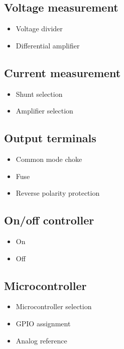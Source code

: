 \FloatBarrier

\subsection{Voltage measurement}
\label{sec_volt_meas}
\begin{itemize}
    \item Voltage divider
    \item Differential amplifier
\end{itemize}

\FloatBarrier

\subsection{Current measurement}
\label{sec_cur_meas}
\begin{itemize}
    \item Shunt selection
    \item Amplifier selection
\end{itemize}

\FloatBarrier

\subsection{Output terminals}
\label{sec_out_term}
\begin{itemize}
    \item Common mode choke
    \item Fuse
    \item Reverse polarity protection
\end{itemize}

\FloatBarrier

\subsection{On/off controller}
\label{sec_onoff}
\begin{itemize}
    \item On
    \item Off
\end{itemize}

\FloatBarrier

\subsection{Microcontroller}
\label{sec_microcontroller}
\begin{itemize}
    \item Microcontroller selection
    \item GPIO assignment
    \item Analog reference
\end{itemize}

